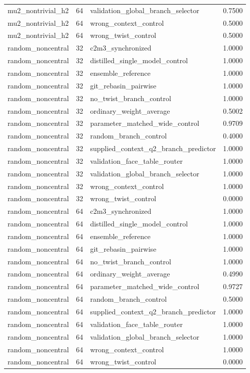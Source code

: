 \begin{tabular}{llll}
mu2\_nontrivial\_h2 & 64 & validation\_global\_branch\_selector & 0.7500\\
mu2\_nontrivial\_h2 & 64 & wrong\_context\_control & 0.5000\\
mu2\_nontrivial\_h2 & 64 & wrong\_twist\_control & 0.5000\\
random\_noncentral & 32 & c2m3\_synchronized & 1.0000\\
random\_noncentral & 32 & distilled\_single\_model\_control & 1.0000\\
random\_noncentral & 32 & ensemble\_reference & 1.0000\\
random\_noncentral & 32 & git\_rebasin\_pairwise & 1.0000\\
random\_noncentral & 32 & no\_twist\_branch\_control & 1.0000\\
random\_noncentral & 32 & ordinary\_weight\_average & 0.5002\\
random\_noncentral & 32 & parameter\_matched\_wide\_control & 0.9709\\
random\_noncentral & 32 & random\_branch\_control & 0.4000\\
random\_noncentral & 32 & supplied\_context\_q2\_branch\_predictor & 1.0000\\
random\_noncentral & 32 & validation\_face\_table\_router & 1.0000\\
random\_noncentral & 32 & validation\_global\_branch\_selector & 1.0000\\
random\_noncentral & 32 & wrong\_context\_control & 1.0000\\
random\_noncentral & 32 & wrong\_twist\_control & 0.0000\\
random\_noncentral & 64 & c2m3\_synchronized & 1.0000\\
random\_noncentral & 64 & distilled\_single\_model\_control & 1.0000\\
random\_noncentral & 64 & ensemble\_reference & 1.0000\\
random\_noncentral & 64 & git\_rebasin\_pairwise & 1.0000\\
random\_noncentral & 64 & no\_twist\_branch\_control & 1.0000\\
random\_noncentral & 64 & ordinary\_weight\_average & 0.4990\\
random\_noncentral & 64 & parameter\_matched\_wide\_control & 0.9727\\
random\_noncentral & 64 & random\_branch\_control & 0.5000\\
random\_noncentral & 64 & supplied\_context\_q2\_branch\_predictor & 1.0000\\
random\_noncentral & 64 & validation\_face\_table\_router & 1.0000\\
random\_noncentral & 64 & validation\_global\_branch\_selector & 1.0000\\
random\_noncentral & 64 & wrong\_context\_control & 1.0000\\
random\_noncentral & 64 & wrong\_twist\_control & 0.0000\\
\bottomrule
\end{tabular}
